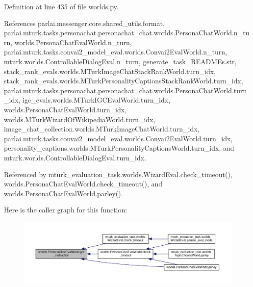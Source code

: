 Definition at line 435 of file worlds.\+py.



References parlai.\+messenger.\+core.\+shared\+\_\+utils.\+format, parlai.\+mturk.\+tasks.\+personachat.\+personachat\+\_\+chat.\+worlds.\+Persona\+Chat\+World.\+n\+\_\+turn, worlds.\+Persona\+Chat\+Eval\+World.\+n\+\_\+turn, parlai.\+mturk.\+tasks.\+convai2\+\_\+model\+\_\+eval.\+worlds.\+Convai2\+Eval\+World.\+n\+\_\+turn, mturk.\+worlds.\+Controllable\+Dialog\+Eval.\+n\+\_\+turn, generate\+\_\+task\+\_\+\+R\+E\+A\+D\+M\+Es.\+str, stack\+\_\+rank\+\_\+evals.\+worlds.\+M\+Turk\+Image\+Chat\+Stack\+Rank\+World.\+turn\+\_\+idx, stack\+\_\+rank\+\_\+evals.\+worlds.\+M\+Turk\+Personality\+Captions\+Stack\+Rank\+World.\+turn\+\_\+idx, parlai.\+mturk.\+tasks.\+personachat.\+personachat\+\_\+chat.\+worlds.\+Persona\+Chat\+World.\+turn\+\_\+idx, igc\+\_\+evals.\+worlds.\+M\+Turk\+I\+G\+C\+Eval\+World.\+turn\+\_\+idx, worlds.\+Persona\+Chat\+Eval\+World.\+turn\+\_\+idx, worlds.\+M\+Turk\+Wizard\+Of\+Wikipedia\+World.\+turn\+\_\+idx, image\+\_\+chat\+\_\+collection.\+worlds.\+M\+Turk\+Image\+Chat\+World.\+turn\+\_\+idx, parlai.\+mturk.\+tasks.\+convai2\+\_\+model\+\_\+eval.\+worlds.\+Convai2\+Eval\+World.\+turn\+\_\+idx, personality\+\_\+captions.\+worlds.\+M\+Turk\+Personality\+Captions\+World.\+turn\+\_\+idx, and mturk.\+worlds.\+Controllable\+Dialog\+Eval.\+turn\+\_\+idx.



Referenced by mturk\+\_\+evaluation\+\_\+task.\+worlds.\+Wizard\+Eval.\+check\+\_\+timeout(), worlds.\+Persona\+Chat\+Eval\+World.\+check\+\_\+timeout(), and worlds.\+Persona\+Chat\+Eval\+World.\+parley().

Here is the caller graph for this function\+:
\nopagebreak
\begin{figure}[H]
\begin{center}
\leavevmode
\includegraphics[width=350pt]{classworlds_1_1PersonaChatEvalWorld_ab3dd599a36597f672da5d54654a0266e_icgraph}
\end{center}
\end{figure}
\mbox{\label{classworlds_1_1PersonaChatEvalWorld_a89e55508c048d8da3aba513b94b9a684}} 
